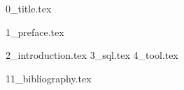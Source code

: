 \documentclass[11pt]{book}
\begin{document}
{0_title.tex}

\tableofcontents
\listoffigures
\listoftables
\lstlistoflistings

\renewcommand{\chaptermark}[1]{\markboth{\normalsize\sffamily\bfseries\ #1}{}} %
{1_preface.tex}

\renewcommand{\chaptermark}[1]{\markboth{\normalsize\sffamily\bfseries\chaptername\ \thechapter.\ #1}{}} %
\mainmatter

{2_introduction.tex}
{3_sql.tex}
{4_tool.tex}

\appendix

\backmatter
{11_bibliography.tex}
\end{document}
